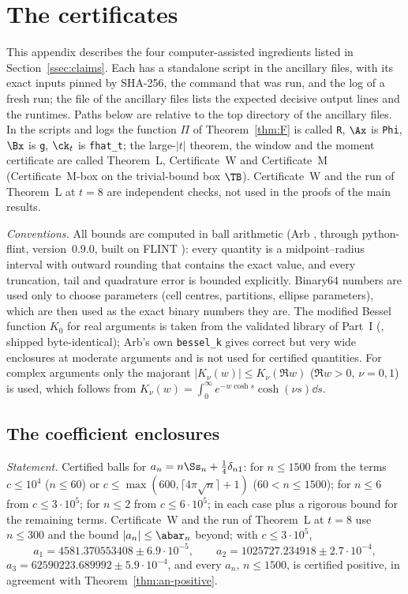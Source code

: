 \section{The certificates}\label{app:cert}

This appendix describes the four computer-assisted ingredients listed in Section~\ref{ssec:claims}. Each has a standalone script in the
ancillary files, with its exact inputs pinned by SHA-256, the command that was run, and the log of a fresh run; the file  of
the ancillary files lists the expected decisive output lines and the runtimes. Paths below are relative to the top directory of the
ancillary files. In the scripts and logs the function $\Pi$ of Theorem~\ref{thm:F} is called \texttt{R}, $\Ax$ is \texttt{Phi}, $\Bx$ is \texttt{g},
$\ck_t$ is \texttt{fhat\_t}; the large-$|t|$ theorem, the window and the moment certificate are called Theorem~L, Certificate~W and
Certificate~M (Certificate~M-box on the trivial-bound box $\TB$). Certificate~W and the run of Theorem~L at $t=8$ are independent checks, not
used in the proofs of the main results.

\emph{Conventions.} All bounds are computed in ball arithmetic (Arb \cite{Joh17}, through python-flint, version~0.9.0, built on FLINT
\cite{FLINT}): every quantity is a midpoint--radius interval with outward rounding that contains the exact value, and every truncation, tail and
quadrature error is bounded explicitly. Binary64 numbers are used only to choose parameters (cell centres, partitions, ellipse parameters),
which are then used as the exact binary numbers they are. The modified Bessel function $K_0$ for real arguments is taken from the validated
library of Part~I (, shipped byte-identical); Arb's own \texttt{bessel\_k} gives correct but very wide enclosures at
moderate arguments and is not used for certified quantities. For complex arguments only the majorant $|K_\nu(w)|\le K_\nu(\Re w)$ ($\Re w>0$,
$\nu=0,1$) is used, which follows from $K_\nu(w)=\int_0^\infty e^{-w\cosh s}\cosh(\nu s)\dd s$.

\subsection{The coefficient enclosures}\label{app:cert-coeffs}

\emph{Statement.} Certified balls for $a_n=n\Ss_n+\frac14\delta_{n1}$: for $n\le1500$ from the terms $c\le10^4$ ($n\le60$) or
$c\le\max(600,\lceil4\pi\sqrt n\rceil+1)$ ($60<n\le1500$); for $n\le6$ from $c\le3\cdot10^5$; for $n\le2$ from $c\le6\cdot10^5$; in each case plus a
rigorous bound for the remaining terms. Certificate~W and the run of Theorem~L at $t=8$ use $n\le300$ and the bound $|a_n|\le\abar_n$ beyond; with
$c\le3\cdot10^5$,
\[
a_1=4581.370553408\pm6.9\cdot10^{-5},\qquad a_2=1025727.234918\pm2.7\cdot10^{-4},
\]
$a_3=62590223.689992\pm5.9\cdot10^{-4}$,
and every $a_n$, $n\le1500$, is certified positive, in agreement with Theorem~\ref{thm:an-positive}.


